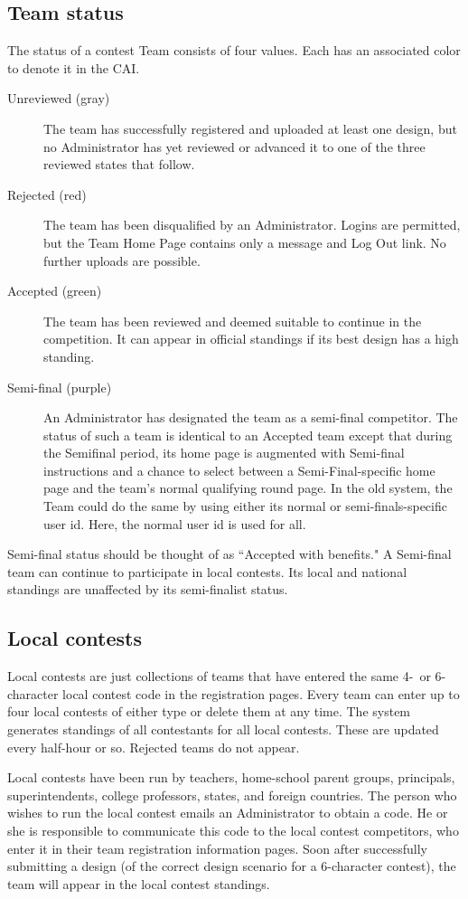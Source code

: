 \documentclass[11pt,letterpaper]{refart}
\begin{document}
\subsection{Team status}
The status of a contest Team consists of four values.  Each has an
associated color to denote it in the CAI.
\begin{description}
\item[Unreviewed (gray)] The team has successfully registered and
  uploaded at least one design, but no Administrator has yet reviewed
  or advanced it to one of the three reviewed states that follow.
\item[Rejected (red)] The team has been disqualified by an
  Administrator.  Logins are permitted, but the Team Home Page
  contains only a message and Log Out link. No further uploads are
  possible.
\item[Accepted (green)] The team has been reviewed and deemed suitable
  to continue in the competition. It can appear in official standings
  if its best design has a high standing.
\item[Semi-final (purple)] An Administrator has designated the team as
  a semi-final competitor. The status of such a team is identical to
  an Accepted team except that during the Semifinal period, its home
  page is augmented with Semi-final instructions and a chance to
  select between a Semi-Final-specific home page and the team's normal
  qualifying round page. In the old system, the Team could do the same
  by using either its normal or semi-finals-specific user id. Here,
  the normal user id is used for all.
\end{description}
Semi-final status should be thought of as ``Accepted with benefits."
A Semi-final team can continue to participate in local contests. Its
local and national standings are unaffected by its semi-finalist
status.

\subsection{Local contests}
Local contests are just collections of teams that have entered the
same 4-\ or 6-character local contest code in the registration
pages. Every team can enter up to four local contests of either type
or delete them at any time. The system generates standings of all
contestants for all local contests. These are updated every half-hour
or so. Rejected teams do not appear.

Local contests have been run by teachers, home-school parent groups,
principals, superintendents, college professors, states, and foreign
countries.  The person who wishes to run the local contest emails an
Administrator to obtain a code. He or she is responsible to
communicate this code to the local contest competitors, who enter it
in their team registration information pages. Soon after successfully
submitting a design (of the correct design scenario for a 6-character
contest), the team will appear in the local contest standings.
\end{document}
